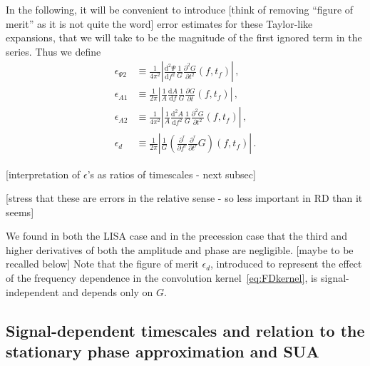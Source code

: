 \documentclass[aps,showpacs,twocolumn,
prd,superscriptaddress,nofootinbib]{revtex4-1}
\newcommand\ud{{\mathrm{d}}}
\newcommand{\tf}{t_{f}}
\newcommand{\SM}[1]{{\color{Red} #1}}
\begin{document}
In the following, it will be convenient to introduce \SM{[think of removing ``figure of merit'' as it is not quite the word]} error estimates for these Taylor-like expansions, that we will take to be the magnitude of the first ignored term in the series. Thus we define
\begin{subequations}\label{eq:deffom}
\begin{align}
	\epsilon_{\Psi 2} &\equiv \frac{1}{4\pi^{2}} \left| \frac{\ud^{2} \Psi}{\ud f^{2}} \frac{1}{G} \frac{\partial^{2} G}{\partial t^{2}}(f, \tf) \right| \,, \\
	\epsilon_{A 1} &\equiv \frac{1}{2\pi} \left| \frac{1}{A}\frac{\ud A}{\ud f} \frac{1}{G} \frac{\partial G}{\partial t}(f, \tf) \right| \,, \\
	\epsilon_{A 2} &\equiv \frac{1}{4\pi^{2}} \left| \frac{1}{A}\frac{\ud^{2} A}{\ud f^{2}} \frac{1}{G} \frac{\partial^{2} G}{\partial t^{2}}(f, \tf) \right| \,, \\
	\epsilon_{d} &\equiv \frac{1}{2\pi} \left| \frac{1}{G} \left( \frac{\partial^{r} }{\partial f^{r}} \frac{\partial^{r} }{\partial t^{r}} G \right)(f, \tf) \right| \,.
\end{align}
\end{subequations}

\SM{[interpretation of $\epsilon$'s as ratios of timescales - next subsec]}

\SM{[stress that these are errors in the relative sense - so less important in RD than it seems]}

We found in both the LISA case and in the precession case that the third and higher derivatives of both the amplitude and phase are negligible. \SM{[maybe to be recalled below]} Note that the figure of merit $\epsilon_{d}$, introduced to represent the effect of the frequency dependence in the convolution kernel~\eqref{eq:FDkernel}, is signal-independent and depends only on $G$.


\subsection{Signal-dependent timescales and relation to the stationary phase approximation and SUA}
\label{subsec:linkSPA}
\end{document}
